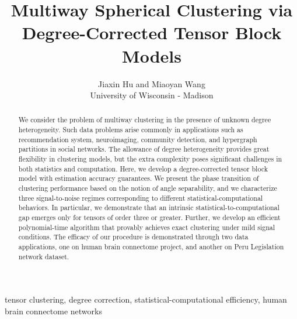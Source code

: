 \documentclass[lettersize,onecolumn,journal]{IEEEtran}
\theoremstyle{definition}
\theoremstyle{definition}
\begin{document}
\title{Multiway Spherical Clustering via \\ Degree-Corrected Tensor Block Models}

\author{ Jiaxin Hu and Miaoyan Wang\\
University of Wisconsin - Madison
}



\maketitle

\begin{abstract}
We consider the problem of multiway clustering in the presence of unknown degree heterogeneity. Such data problems arise commonly in applications such as recommendation system, neuroimaging, community detection, and hypergraph partitions in social networks. The allowance of degree heterogeneity provides great flexibility in clustering models, but the extra complexity poses significant challenges in both statistics and computation. Here, we develop a degree-corrected tensor block model with estimation accuracy guarantees. We present the phase transition of clustering performance based on the notion of angle separability, and we characterize three signal-to-noise regimes corresponding to different statistical-computational behaviors. In particular, we demonstrate that an intrinsic statistical-to-computational gap emerges only for tensors of order three or greater. Further, we develop an efficient polynomial-time algorithm that provably achieves exact clustering under mild signal conditions. The efficacy of our procedure is demonstrated through two data applications, one on human brain connectome project, and another on Peru Legislation network dataset. 
\end{abstract}

\begin{IEEEkeywords}
tensor clustering, degree correction, statistical-computational efficiency, human brain connectome networks
\end{IEEEkeywords}
\end{document}
